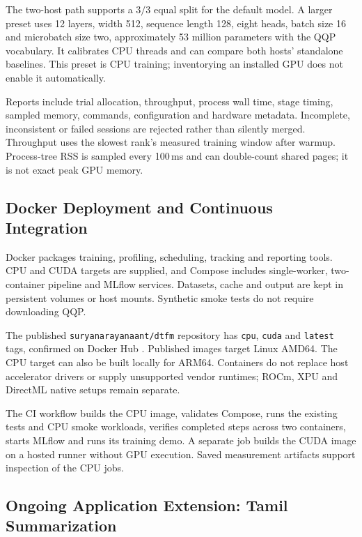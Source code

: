 The two-host path supports a $3/3$ equal split for the default model. A larger preset uses 12 layers, width 512, sequence length 128, eight heads, batch size 16 and microbatch size two, approximately 53 million parameters with the QQP vocabulary. It calibrates CPU threads and can compare both hosts' standalone baselines. This preset is CPU training; inventorying an installed GPU does not enable it automatically.

Reports include trial allocation, throughput, process wall time, stage timing, sampled memory, commands, configuration and hardware metadata. Incomplete, inconsistent or failed sessions are rejected rather than silently merged. Throughput uses the slowest rank's measured training window after warmup. Process-tree RSS is sampled every 100\,ms and can double-count shared pages; it is not exact peak GPU memory.

\subsection{Docker Deployment and Continuous Integration}

Docker packages training, profiling, scheduling, tracking and reporting tools. CPU and CUDA targets are supplied, and Compose includes single-worker, two-container pipeline and MLflow services. Datasets, cache and output are kept in persistent volumes or host mounts. Synthetic smoke tests do not require downloading QQP.

The published \texttt{suryanarayanaant/dtfm} repository has \texttt{cpu}, \texttt{cuda} and \texttt{latest} tags, confirmed on Docker Hub \cite{dockerhub}. Published images target Linux AMD64. The CPU target can also be built locally for ARM64. Containers do not replace host accelerator drivers or supply unsupported vendor runtimes; ROCm, XPU and DirectML native setups remain separate.

The CI workflow builds the CPU image, validates Compose, runs the existing tests and CPU smoke workloads, verifies completed steps across two containers, starts MLflow and runs its training demo. A separate job builds the CUDA image on a hosted runner without GPU execution. Saved measurement artifacts support inspection of the CPU jobs.

\subsection{Ongoing Application Extension: Tamil Summarization}

